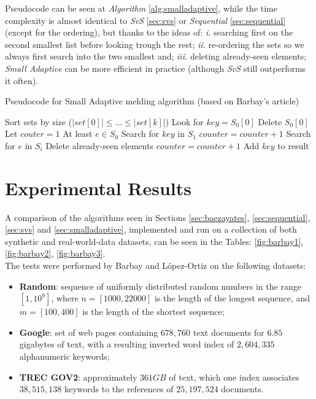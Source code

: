 Pseudocode can be seen at \textit{Algorithm} \ref{alg:smalladaptive}, while the time complexity is almost identical to \textit{SvS} \ref{sec:svs} or \textit{Sequential} \ref{sec:sequential} (except for the ordering), but thanks to the ideas of: \textit{i.} searching first on the second smallest list before looking trough the rest; \textit{ii.} re-ordering the sets so we always first search into the two smallest and; \textit{iii.} deleting already-seen elements; \textit{Small Adaptive} can be more efficient in practice (although \textit{SvS} still outperforms it often). 

\begin{algorithm}
    \captionsetup{labelsep=newline}
    \caption{Pseudocode for Small Adaptive melding algorithm \label{alg:smalladaptive} (based on Barbay's article)}
    \begin{algorithmic}[1]
            \State Sort sets by size \big($\big|set[0]\big| \leq \ldots \leq \big|set[k]\big|$\big)
            \State Look for $key=S_0[0]$
            \State Delete $S_0[0]$
            \State Let $couter=1$ \Comment At least $e \in S_0$ 
            \State Search for $key$ in $S_1$
                \State $counter=counter+1$
                    \State Search for $e$ in $S_i$
                    \State Delete already-seen elements 
                        \State $counter=counter+1$
                    \EndIf
                \EndFor
            \EndIf
                \State Add $key$ to result
            \EndIf
        \EndWhile
    \end{algorithmic}
\end{algorithm}

\section{Experimental Results}

A comparison of the algorithms seen in Sections \ref{sec:baezayates}, \ref{sec:sequential}, \ref{sec:svs} and \ref{sec:smalladaptive}, implemented and run on a collection of both synthetic and real-world-data datasets, can be seen in the Tables: \ref{fig:barbay1}, \ref{fig:barbay2}, \ref{fig:barbay3}. \\
The tests were performed by Barbay and López-Ortiz on the following datasets:
\begin{itemize}
    \item \textbf{Random}: sequence of uniformly distributed random numbers in the range $\left[1, 10^9 \right]$, where $n=[1000, 22000]$ is the length of the longest sequence, and $m=[100, 400]$ is the length of the shortest sequence;
    \item \textbf{Google}: set of web pages containing $678,760$ text documents for $6.85$ gigabytes of text, with a resulting inverted word index of $2,604,335$ alphanumeric keywords;
    \item \textbf{TREC GOV2}: approximately $361GB$ of text, which one index associates $38,515,138$ keywords to the references of $25,197,524$ documents.
\end{itemize}

